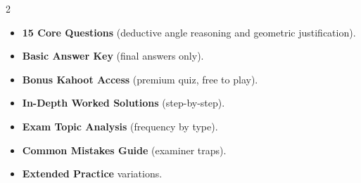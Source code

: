 \documentclass[11pt,a4paper]{article}
\newcommand{\FullReleaseDate}{April 30, 2026}
\begin{document}
\vspace{8pt}

\begin{multicols}{2}
  \begin{tcolorbox}[card, title=\sffamily\bfseries\textcolor{white}{\faHandPointDown\ TODAY (Simplified Version)}, colbacktitle=mainblue, boxed title style={sharp corners, boxrule=0pt}]
    \begin{itemize}[leftmargin=1.2em, itemsep=2pt]
      \item \small \textbf{15 Core Questions} (deductive angle reasoning and geometric justification).
      \item \small \textbf{Basic Answer Key} (final answers only).
      \item \small \textbf{Bonus Kahoot Access} (premium quiz, free to play).
    \end{itemize}
  \end{tcolorbox}

  \columnbreak

  \begin{tcolorbox}[card, title=\sffamily\bfseries\textcolor{white}{\faRocket\ ON \FullReleaseDate\ (Full Upgrade)}, colbacktitle=mainblue, boxed title style={sharp corners, boxrule=0pt}]
    \begin{itemize}[leftmargin=1.2em, itemsep=2pt]
      \item \small \textbf{In-Depth Worked Solutions} (step-by-step).
      \item \small \textbf{Exam Topic Analysis} (frequency by type).
      \item \small \textbf{Common Mistakes Guide} (examiner traps).
      \item \small \textbf{Extended Practice} variations.
    \end{itemize}
  \end{tcolorbox}
\end{multicols}
\end{document}
